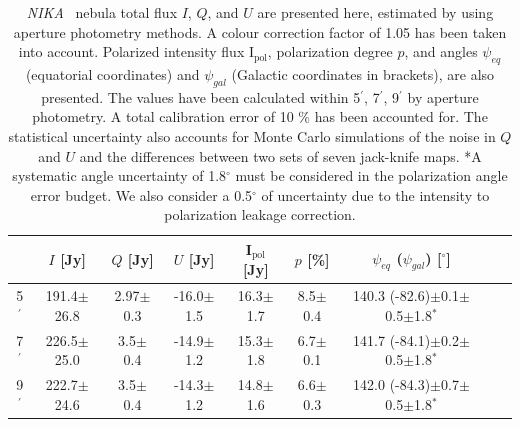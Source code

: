 \documentclass[twocolumn,traditabstract]{aa}
\def\NIKA{\textit{NIKA}}
\begin{document}
\begin{table}[h!]
  \centering
      \begin{tabular}{ccccccccc}
      \hline
      \hline
       & \small $I$ [Jy] & \small $Q$ [Jy] & \small $U$ [Jy] & \small I$_\textrm{pol}$ [Jy] & \small $p$ [\%] & \small $\psi_{eq}$ ($\psi_{gal}$) [$^\circ$] \\
      \hline

\small 5$^{\prime}$ & \small 191.4$\pm$26.8 & \small 2.97$\pm$0.3 & \small -16.0$\pm$1.5 & \small 16.3$\pm$1.7 & \small 8.5$\pm$0.4 & \small 140.3 (-82.6)$\pm$0.1$\pm$0.5$\pm$1.8$^*$  \\ 
\small 7$^{\prime}$ & \small 226.5$\pm$25.0 & \small 3.5$\pm$0.4 & \small -14.9$\pm$1.2 & \small 15.3$\pm$1.8 & \small 6.7$\pm$0.1 & \small 141.7 (-84.1)$\pm$0.2$\pm$0.5$\pm$1.8$^*$ \\ 
\small 9$^{\prime}$ & \small 222.7$\pm$24.6 & \small 3.5$\pm$0.4 & \small -14.3$\pm$1.2 & \small 14.8$\pm$1.6 & \small 6.6$\pm$0.3 & \small 142.0 (-84.3)$\pm$0.7$\pm$0.5$\pm$1.8$^*$ \\ 
\hline            
    \hline   
    \end{tabular}
   \caption{ 
   \NIKA\  nebula total flux $I$, $Q$, and $U$ are  presented here, estimated by using aperture photometry methods. A colour correction factor of 1.05 has been taken into account. Polarized intensity flux I$_\textrm{pol}$, polarization degree $p$, and angles $\psi_{eq}$ (equatorial coordinates) and $\psi_{gal}$ (Galactic coordinates in brackets), are also presented. The values have been calculated within 5$^{\prime}$, 7$^{\prime}$, 9$^{\prime}$ by aperture photometry.
   A total calibration error of 10 $\%$ has been accounted for. The statistical uncertainty also accounts  for Monte Carlo simulations of the noise in $Q$ and $U$ and the differences between two sets  of seven jack-knife maps.
 *A systematic angle uncertainty of 1.8$^{\circ}$ must be considered in the polarization angle error budget. We also consider a 0.5$^{\circ}$ of uncertainty due to the intensity to polarization leakage correction.    
    }
    \label{tab:crab_results}
 \end{table}
\end{document}
